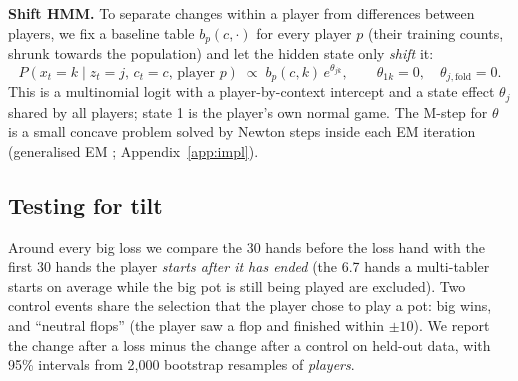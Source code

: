 \textbf{Shift HMM.} To separate changes within a player from differences between players, we fix a baseline table $b_p(c,\cdot)$ for every player $p$ (their training counts, shrunk towards the population) and let the hidden state only \emph{shift} it:
\begin{equation}
P(x_t=k\mid z_t=j,\,c_t=c,\,\text{player }p)\;\propto\;b_p(c,k)\,e^{\theta_{jk}},\qquad\theta_{1k}=0,\quad\theta_{j,\text{fold}}=0 .
\label{eq:shift}
\end{equation}
This is a multinomial logit with a player-by-context intercept and a state effect $\theta_j$ shared by all players; state 1 is the player's own normal game. The M-step for $\theta$ is a small concave problem solved by Newton steps inside each EM iteration (generalised EM \cite{dempster1977}; Appendix~\ref{app:impl}).

\subsection{Testing for tilt}
Around every big loss we compare the 30 hands before the loss hand with the first 30 hands the player \emph{starts after it has ended} (the 6.7 hands a multi-tabler starts on average while the big pot is still being played are excluded). Two control events share the selection that the player chose to play a pot: big wins, and ``neutral flops'' (the player saw a flop and finished within $\pm10$\bb). We report the change after a loss minus the change after a control on held-out data, with 95\% intervals from 2{,}000 bootstrap resamples of \emph{players}.

